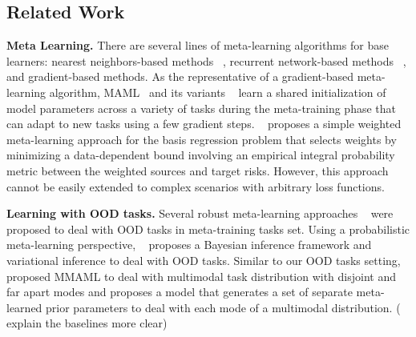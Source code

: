 \subsection{Related Work}
\textbf{Meta Learning.} There are several lines of meta-learning algorithms for base learners: nearest neighbors-based methods ~\citep{vinyals2016matching, snell2017prototypical}, recurrent network-based methods ~\citep{ravi2016optimization}, and gradient-based methods. As the representative of a gradient-based meta-learning algorithm, MAML~\citep{finn2017model} and its variants ~\citep{finn2018probabilistic, antoniou2018train, nichol2018first, rusu2018meta,rajeswaran2019meta, behl2019alpha, raghu2019rapid, zhao2020fair} learn a shared initialization of model parameters across a variety of tasks during the meta-training phase that can adapt to new tasks using a few gradient steps. ~\citeauthor{cai2020weightedmeta} proposes a simple weighted meta-learning approach for the basis regression problem that selects weights by minimizing a data-dependent bound involving an empirical integral probability metric between the weighted sources and target risks. However, this approach cannot be easily extended to complex scenarios with arbitrary loss functions. %

\textbf{Learning with OOD tasks.} %
Several robust meta-learning approaches ~\citep{vuorio2019multimodal, triantafillou2019meta,yao2020automated} were proposed to deal with OOD tasks in meta-training tasks set. Using a probabilistic meta-learning perspective, {\color{red}~\cite{lee2020l2b} proposes a Bayesian inference framework and variational inference to deal with OOD tasks.} Similar to our OOD tasks setting, ~\cite{vuorio2019multimodal} proposed  MMAML to deal with multimodal task distribution with disjoint and far apart modes and proposes a model that generates a set of separate meta-learned prior parameters to deal with each mode of a multimodal distribution. ({\color{red} explain the baselines more clear})

